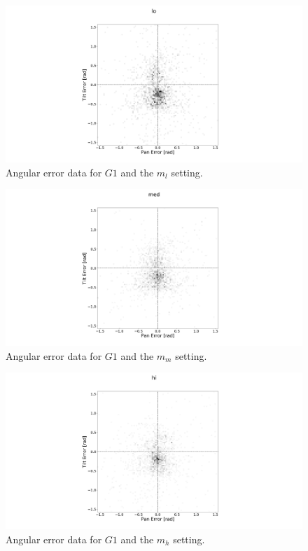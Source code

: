 \documentclass[sigconf, screen=true, anonymous=true]{acmart}
\begin{document}
\begin{figure}
  \centering
  \includegraphics[clip, trim=450 0 450 110, width=0.8\columnwidth]{figures/err_lo.png}
  \caption{Angular error data for $G1$ and the $m_l$ setting. }\label{fig:err-results-lo}
\end{figure}

\begin{figure}
  \centering
  \includegraphics[clip, trim=450 0 450 110, width=0.8\columnwidth]{figures/err_med.png}
  \caption{Angular error data for $G1$ and the $m_m$ setting. }\label{fig:err-results-med}
\end{figure}

\begin{figure}
  \centering
  \includegraphics[clip, trim=450 0 450 110, width=0.8\columnwidth]{figures/err_hi.png}
  \caption{Angular error data for $G1$ and the $m_h$ setting. }\label{fig:err-results-hi}
\end{figure}
\end{document}
